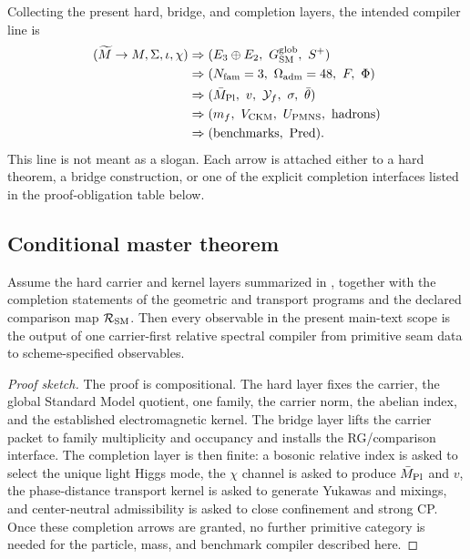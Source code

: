 Collecting the present hard, bridge, and completion layers, the intended compiler line is
\begin{equation}
\label{eq:conditional-compiler-chain}
\begin{aligned}
(\widetilde M\to M,\Sigma,\iota,\chi)
&\Rightarrow
(E_3\oplus E_2,\ G_{\mathrm{SM}}^{\mathrm{glob}},\ S^+)\\
&\Rightarrow
(N_{\mathrm{fam}}=3,\ \Omega_{\mathrm{adm}}=48,\ F,\ \Phi)\\
&\Rightarrow
(\bar M_{\mathrm{Pl}},\ v,\ \mathcal Y_f,\ \sigma,\ \bar\theta)\\
&\Rightarrow
(m_f,\ V_{\mathrm{CKM}},\ U_{\mathrm{PMNS}},\ \text{hadrons})\\
&\Rightarrow
(\text{benchmarks},\ \operatorname{Pred}).
\end{aligned}
\end{equation}
This line is not meant as a slogan. Each arrow is attached either to a hard theorem, a bridge construction, or one of the explicit completion interfaces listed in the proof-obligation table below.

\subsection{Conditional master theorem}

\begin{theorem}
Assume the hard carrier and kernel layers summarized in , together with the completion statements of the geometric and transport programs and the declared comparison map $\mathcal R_{\mathrm{SM}}$. Then every observable in the present main-text scope is the output of one carrier-first relative spectral compiler from primitive seam data to scheme-specified observables.
\end{theorem}

\begin{proof}[Proof sketch]
The proof is compositional. The hard layer fixes the carrier, the global Standard Model quotient, one family, the carrier norm, the abelian index, and the established electromagnetic kernel. The bridge layer lifts the carrier packet to family multiplicity and occupancy and installs the RG/comparison interface. The completion layer is then finite: a bosonic relative index is asked to select the unique light Higgs mode, the $\chi$ channel is asked to produce $\bar M_{\mathrm{Pl}}$ and $v$, the phase-distance transport kernel is asked to generate Yukawas and mixings, and center-neutral admissibility is asked to close confinement and strong CP. Once these completion arrows are granted, no further primitive category is needed for the particle, mass, and benchmark compiler described here.
\end{proof}

